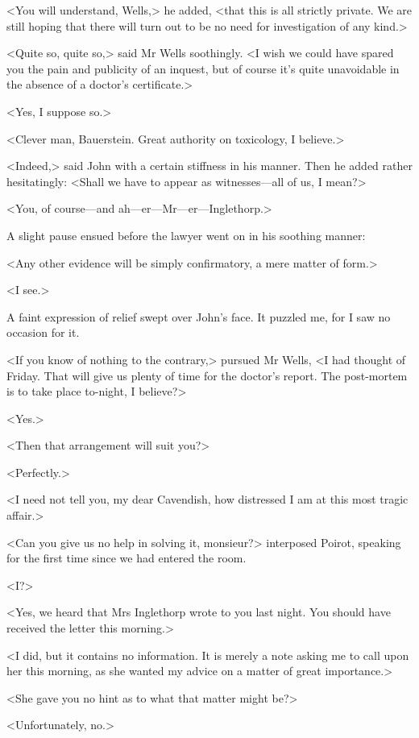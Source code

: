  <You will understand, Wells,> he added, <that this is all strictly private. We are still hoping that there will turn out to be no need for investigation of any kind.> 

 <Quite so, quite so,> said Mr Wells soothingly. <I wish we could have spared you the pain and publicity of an inquest, but of course it's quite unavoidable in the absence of a doctor's certificate.> 

 <Yes, I suppose so.> 

 <Clever man, Bauerstein. Great authority on toxicology, I believe.> 

 <Indeed,> said John with a certain stiffness in his manner. Then he added rather hesitatingly: <Shall we have to appear as witnesses—all of us, I mean?> 

 <You, of course—and ah—er—Mr—er—Inglethorp.> 

 A slight pause ensued before the lawyer went on in his soothing manner: 

 <Any other evidence will be simply confirmatory, a mere matter of form.> 

 <I see.> 

 A faint expression of relief swept over John's face. It puzzled me, for I saw no occasion for it. 

 <If you know of nothing to the contrary,> pursued Mr Wells, <I had thought of Friday. That will give us plenty of time for the doctor's report. The post-mortem is to take place to-night, I believe?> 

 <Yes.> 

 <Then that arrangement will suit you?> 

 <Perfectly.> 

 <I need not tell you, my dear Cavendish, how distressed I am at this most tragic affair.> 

 <Can you give us no help in solving it, monsieur?> interposed Poirot, speaking for the first time since we had entered the room. 

 <I?> 

 <Yes, we heard that Mrs Inglethorp wrote to you last night. You should have received the letter this morning.> 

 <I did, but it contains no information. It is merely a note asking me to call upon her this morning, as she wanted my advice on a matter of great importance.> 

 <She gave you no hint as to what that matter might be?> 

 <Unfortunately, no.> 

